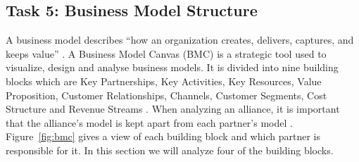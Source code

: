 \subsection{Task 5: Business Model Structure}
\label{sec:task5}

A business model describes ``how an organization creates, delivers, captures, and keeps value'' \parencite[p.~283]{overby2021}. A Business Model Canvas (BMC) is a strategic tool used to visualize, design and analyse business models. It is divided into nine building blocks which are Key Partnerships, Key Activities, Key Resources, Value Proposition, Customer Relationships, Channels, Customer Segments, Cost Structure and Revenue Streams \parencite[pp.~285--287]{overby2021}. When analyzing an alliance, it is important that the alliance's model is kept apart from each partner's model \parencite[slide~31]{windekilde2026}. Figure~\ref{fig:bmc} gives a view of each building block and which partner is responsible for it. In this section we will analyze four of the building blocks.

